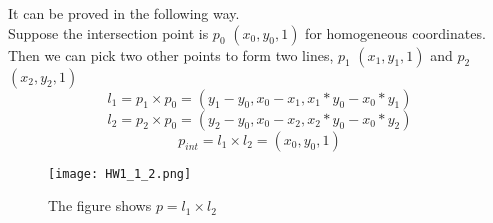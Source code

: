 \documentclass[10pt]{article}
\begin{document}
\begin{enumerate}
It can be proved in the following way.\\
Suppose the intersection point is $p_0$ $(x_0,y_0,1)$ for homogeneous coordinates. Then we can pick two other points to form two lines, $p_1$ $(x_1,y_1,1)$ and $p_2$ $(x_2,y_2,1)$\\
\begin{equation}
l_1=p_1\times p_0 = (y_1-y_0,x_0-x_1,x_1*y_0-x_0*y_1)
\end{equation}
\begin{equation}
l_2=p_2\times p_0 = (y_2-y_0,x_0-x_2,x_2*y_0-x_0*y_2)
\end{equation}
\begin{equation}
p_{int}=l_1\times l_2 = (x_0,y_0,1)
\end{equation}
\begin{figure}[htdb]
\centering
\texttt{[image: HW1\_1\_2.png]}
\caption{The figure shows $p=l_1\times l_2$}\label{fig:figure2}
\end{figure}
\end{enumerate}
\end{document}
